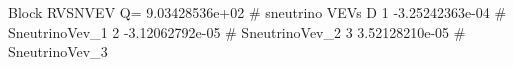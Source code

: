 Block RVSNVEV Q= 9.03428536e+02 # sneutrino VEVs D 
     1   -3.25242363e-04   # SneutrinoVev_{1}
     2   -3.12062792e-05   # SneutrinoVev_{2}
     3    3.52128210e-05   # SneutrinoVev_{3}
